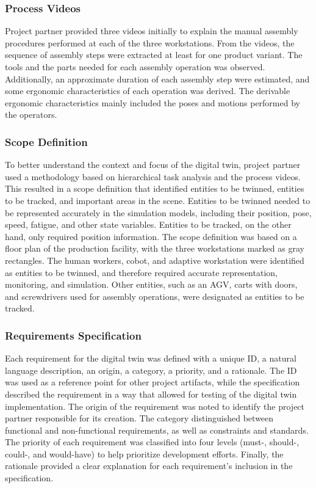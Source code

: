 \documentclass{llncs}
\begin{document}
    \subsubsection*{Process Videos}
    Project partner provided three videos initially to explain the manual assembly procedures performed at each of the three workstations. From the videos,  
    the sequence of assembly steps were extracted  at least for one product variant. The tools and the parts needed for each assembly operation was observed. Additionally, an approximate duration of each assembly step were estimated, and some ergonomic characteristics of each operation was derived. 
    The derivable ergonomic characteristics mainly included the poses and motions performed by the operators.

    \subsubsection*{Scope Definition}
    To better understand the context and focus of the digital twin, 
    project partner used a methodology based on hierarchical task analysis and the process videos. 
    This resulted in a scope definition that identified entities to be twinned, entities to be tracked, and important areas in the scene. 
    Entities to be twinned needed to be represented accurately in the simulation models, including their position, pose, speed, fatigue, and other state variables. 
    Entities to be tracked, on the other hand, only required position information. The scope definition was based on a floor plan of the production facility, with the three workstations marked as gray rectangles. 
    The human workers, cobot, and adaptive workstation were identified as entities to be twinned, and therefore required accurate representation, 
    monitoring, and simulation. Other entities, such as an AGV, carts with doors, and screwdrivers used for assembly operations, were designated as entities to be tracked.
    \subsubsection*{Requirements Specification}
    Each requirement for the digital twin was defined with a unique ID, a natural language description, an origin, a category, a priority, and a rationale. The ID was used as a reference point for other project artifacts, while the specification described the requirement in a way that allowed for testing of the digital twin implementation. The origin of the requirement was noted to identify the project partner responsible for its creation. The category distinguished between functional and non-functional requirements, as well as constraints and standards. The priority of each requirement was classified into four levels 
    (must-, should-, could-, and would-have) to help prioritize development efforts. 
    Finally, the rationale provided a clear explanation for each requirement's inclusion in the specification.
\end{document}
